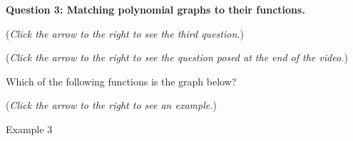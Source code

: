 \documentclass{ximera}
\begin{document}
\textbf{Question 3: Matching polynomial graphs to their functions.}
\begin{question}
\begin{flushright}
{\color{blue}(\emph{Click the arrow to the right to see the third question.}) }
\end{flushright}
\begin{center}
\begin{expandable}
\begin{flushright}
{\color{blue}(\emph{Click the arrow to the right to see the question
posed at the end of the video.})}
\end{flushright}
\begin{expandable}
Which of the following functions is the graph below?
\begin{multipleChoice}
\end{multipleChoice}
\begin{flushright}
{\color{blue}(\emph{Click the arrow to the right to see an example.})}
\end{flushright}
\begin{expandable}
Example 3
\end{expandable}
\end{expandable}
\end{expandable}
\end{center}
\end{question}
\end{document}
